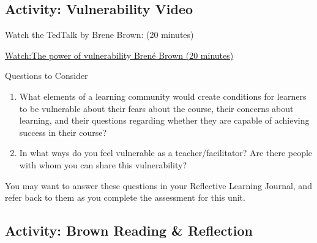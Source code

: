 \documentclass[
]{book}
\providecommand{\tightlist}{%
  \setlength{\itemsep}{0pt}\setlength{\parskip}{0pt}}
\begin{document}
\hypertarget{activity-vulnerability-video}{%
\subsection*{Activity: Vulnerability Video}\label{activity-vulnerability-video}}

\begin{reflect}
Watch the TedTalk by Brene Brown: (20 minutes)

\href{https://www.youtube.com/watch?v=iCvmsMzlF7o}{Watch:The power of
vulnerability \textbar{} Brené Brown (20 minutes)}

{Questions to Consider}

\begin{enumerate}
\def\labelenumi{\arabic{enumi}.}
\tightlist
\item
  What elements of a learning community would create conditions for
  learners to be vulnerable about their fears about the course, their
  concerns about learning, and their questions regarding whether they
  are capable of achieving success in their course?\\
\item
  In what ways do you feel vulnerable as a teacher/facilitator? Are
  there people with whom you can share this vulnerability?
\end{enumerate}

You may want to answer these questions in your Reflective Learning
Journal, and refer back to them as you complete the assessment for this
unit.
\end{reflect}

\hypertarget{activity-brown-reading-reflection}{%
\subsection*{Activity: Brown Reading \& Reflection}\label{activity-brown-reading-reflection}}
\end{document}
